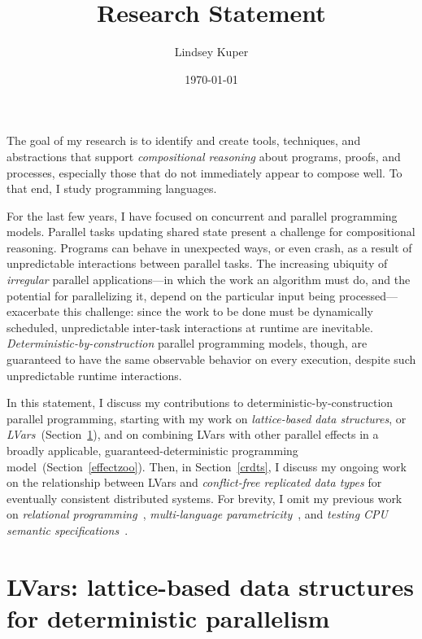 \documentclass{article}
\def\name{Lindsey Kuper}
\begin{document}
\title{Research Statement}

\author{\name}

\date{\today}

\maketitle

\noindent 
The goal of my research is to identify and create tools, techniques,
and abstractions that support \emph{compositional reasoning} about
programs, proofs, and processes, especially those that do not
immediately appear to compose well.  To that end, I study programming
languages.

For the last few years, I have focused on concurrent and parallel
programming models.  Parallel tasks updating shared state present a
challenge for compositional reasoning. Programs can behave in
unexpected ways, or even crash, as a result of unpredictable
interactions between parallel tasks.  The increasing ubiquity of
\emph{irregular} parallel applications---in which the work an
algorithm must do, and the potential for parallelizing it, depend on
the particular input being processed---exacerbate this challenge:
since the work to be done must be dynamically scheduled, unpredictable
inter-task interactions at runtime are inevitable.
\emph{Deterministic-by-construction} parallel programming models,
though, are guaranteed to have the same observable behavior on every
execution, despite such unpredictable runtime interactions.

In this statement, I discuss my contributions to
deterministic-by-construction parallel programming, starting with my
work on \emph{lattice-based data structures}, or
\emph{LVars}~(Section~\ref{lvars}), and on combining LVars with other
parallel effects in a broadly applicable, guaranteed-deterministic
programming model~(Section~\ref{effectzoo}).  Then, in
Section~\ref{crdts}, I discuss my ongoing work on the relationship
between LVars and \emph{conflict-free replicated data types} for
eventually consistent distributed systems.  For brevity, I omit my
previous work on \emph{relational programming}~\cite{lambdae},
\emph{multi-language parametricity}~\cite{multilang-talk}, and
\emph{testing CPU semantic specifications}~\cite{tsl-tr}.

\section{LVars: lattice-based data structures for deterministic parallelism}\label{lvars}
\end{document}
